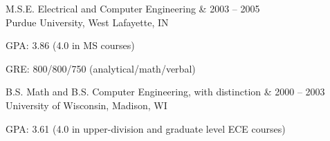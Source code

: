 \documentclass[letterpaper]{scrartcl}
\begin{document}
\begin{list1}
	\item
	\begin{tabular1bold}M.S.E. Electrical and Computer Engineering & 2003 -- 2005 \\
	Purdue University, West Lafayette, IN
	\end{tabular1bold}

	\begin{list2}
	\item GPA: 3.86 (4.0 in MS courses)
	\item GRE: 800/800/750 (analytical/math/verbal)
	\end{list2}
	\item
	\begin{tabular1bold}B.S. Math and B.S. Computer Engineering, with distinction & 2000 -- 2003 \\
	University of Wisconsin, Madison, WI
	\end{tabular1bold}

	\begin{list2}
	\item GPA: 3.61 (4.0 in upper-division and graduate level ECE courses)
	\end{list2}

\end{list1}
\end{document}
